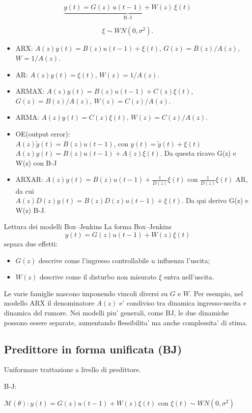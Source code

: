 \documentclass[11pt,a4paper]{article}
\begin{document}
\[
\underbrace{y(t)=G(z)\,u(t-1)+W(z)\,\xi(t)}_{\text{B--J}}
\]

\[
 \xi\sim WN(0,\sigma^2).
\]
\begin{itemize}
  \item ARX: $A(z)y(t)=B(z)u(t-1)+\xi(t)$, $G(z)=B(z)/A(z)$, $W=1/A(z)$.
  \item AR: $A(z)y(t)=\xi(t)$, $W(z)=1/A(z)$.
  \item ARMAX: $A(z)y(t)=B(z)u(t-1)+C(z)\xi(t)$, $G(z)=B(z)/A(z)$, $W(z)=C(z)/A(z)$.
  \item ARMA: $A(z)y(t)=C(z)\xi(t)$,  $W(z)=C(z)/A(z)$.
  \item OE(output error): \\$A(z)\tilde y(t)=B(z)u(t-1)$, con $y(t)=\tilde y(t)+\xi(t)$\\
  $A(z)y(t)=B(z)u(t-1)+A(z)\xi(t)$. Da questa ricavo G(z) e W(z) con B-J
  \item ARXAR: $A(z)y(t)=B(z)u(t-1)+\tfrac{1}{D(z)}\xi(t)$ con $\tfrac{1}{D(z)}\xi(t)$ AR, da cui \\$A(z)D(z)y(t)=B(z)D(z)u(t-1)+\xi(t)$. Da qui derivo G(z) e W(z) B-J. 
\end{itemize}

\begin{spiegazione}{Lettura dei modelli Box--Jenkins}
La forma Box--Jenkins
\[
y(t)=G(z)u(t-1)+W(z)\xi(t)
\]
separa due effetti:
\begin{itemize}
  \item $G(z)$ descrive come l'ingresso controllabile $u$ influenza l'uscita;
  \item $W(z)$ descrive come il disturbo non misurato $\xi$ entra nell'uscita.
\end{itemize}
Le varie famiglie nascono imponendo vincoli diversi su $G$ e $W$. Per esempio, nel modello ARX il denominatore $A(z)$ e' condiviso tra dinamica ingresso-uscita e dinamica del rumore. Nei modelli piu' generali, come BJ, le due dinamiche possono essere separate, aumentando flessibilita' ma anche complessita' di stima.
\end{spiegazione}

\subsection{Predittore in forma unificata (BJ)}
Uniformare trattazione a livello di predittore.

B-J:

$\mathcal{M(\theta)}: y(t) = G(z)u(t-1)+W(z)\xi(t)$
con $\xi(t)\sim WN(0, \sigma^2)$
\end{document}
